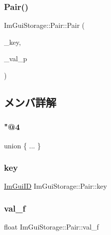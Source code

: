 \subsubsection{\texorpdfstring{Pair()}{Pair()}\hspace{0.1cm}{\footnotesize\ttfamily [3/3]}}
{\footnotesize\ttfamily Im\+Gui\+Storage\+::\+Pair\+::\+Pair (\begin{DoxyParamCaption}\item[{\mbox{\hyperlink{imgui_8h_a1785c9b6f4e16406764a85f32582236f}{Im\+Gui\+ID}}}]{\+\_\+key,  }\item[{void $\ast$}]{\+\_\+val\+\_\+p }\end{DoxyParamCaption})\hspace{0.3cm}{\ttfamily [inline]}}



\subsection{メンバ詳解}
\mbox{\label{struct_im_gui_storage_1_1_pair_a73bc1ed446f73086b5fb3efabfcd1e8a}} 
\subsubsection{\texorpdfstring{"@4}{@4}}
{\footnotesize\ttfamily union \{ ... \} }

\mbox{\label{struct_im_gui_storage_1_1_pair_a5b37b692d2eacc7f4f5b6f233359e6ce}} 
\subsubsection{\texorpdfstring{key}{key}}
{\footnotesize\ttfamily \mbox{\hyperlink{imgui_8h_a1785c9b6f4e16406764a85f32582236f}{Im\+Gui\+ID}} Im\+Gui\+Storage\+::\+Pair\+::key}

\mbox{\label{struct_im_gui_storage_1_1_pair_adf93d369480896f4d4b6dbf707de7bc8}} 
\subsubsection{\texorpdfstring{val\+\_\+f}{val\_f}}
{\footnotesize\ttfamily float Im\+Gui\+Storage\+::\+Pair\+::val\+\_\+f}

